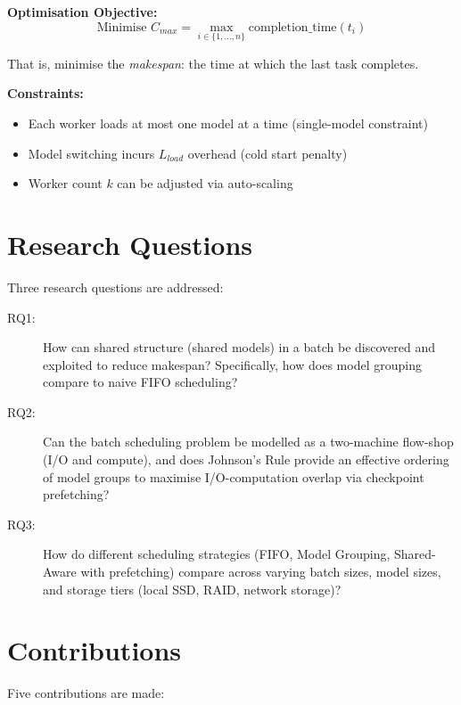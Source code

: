 \documentclass[logo,bsc,singlespacing,parskip,online]{infthesis}
\begin{document}
\textbf{Optimisation Objective:}
$$\text{Minimise } C_{max} = \max_{i \in \{1,...,n\}} \text{completion\_time}(t_i)$$

That is, minimise the \textit{makespan}: the time at which the last task completes.

\textbf{Constraints:}
\begin{itemize}
\item Each worker loads at most one model at a time (single-model constraint)
\item Model switching incurs $L_{load}$ overhead (cold start penalty)
\item Worker count $k$ can be adjusted via auto-scaling
\end{itemize}

\section{Research Questions}

Three research questions are addressed:

\begin{description}
\item[RQ1:] How can shared structure (shared models) in a batch be discovered and exploited to reduce makespan? Specifically, how does model grouping compare to naive FIFO scheduling?

\item[RQ2:] Can the batch scheduling problem be modelled as a two-machine flow-shop (I/O and compute), and does Johnson's Rule provide an effective ordering of model groups to maximise I/O-computation overlap via checkpoint prefetching?

\item[RQ3:] How do different scheduling strategies (FIFO, Model Grouping, Shared-Aware with prefetching) compare across varying batch sizes, model sizes, and storage tiers (local SSD, RAID, network storage)?
\end{description}

\section{Contributions}

Five contributions are made:
\end{document}
